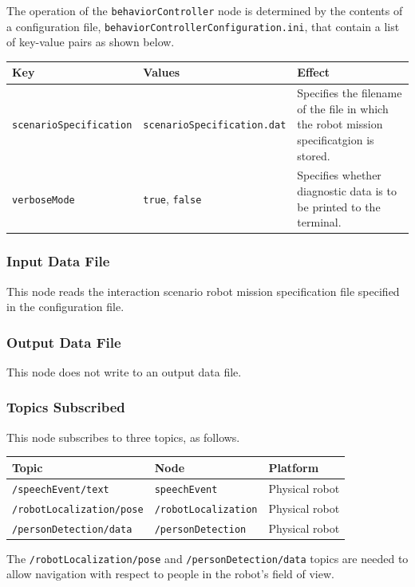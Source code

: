 \documentclass{CSSRforAfrica}
\begin{document}
The operation of the {\small \verb+behaviorController+} node is determined by the contents of a configuration file,  {\small \verb+behaviorControllerConfiguration.ini+},  that  contain a list of key-value pairs as shown below.  
 
\begin{center}
\begin{tabularx}{\linewidth}{| l | l | X|}
\hline 
{\small Key }                               & {\small Values }                                                 &  {\small Effect}       \\
\hline
{\footnotesize \verb+scenarioSpecification+}  & {\footnotesize \verb+scenarioSpecification.dat+}     & {\small Specifies the filename of the file in which the robot mission specificatgion is stored.} \\
\hline
{\footnotesize \verb+verboseMode+}  & {\footnotesize \verb+true+, \verb+false+}     & {\small Specifies whether diagnostic data is to be printed to the terminal.} \\
\hline
\end{tabularx}
\end{center}

\subsubsection*{Input Data File}
This node reads the interaction scenario robot mission specification file specified in the configuration file.


\subsubsection*{Output Data File}
This node does not write to an output data file.


\subsubsection*{Topics Subscribed}
This node  subscribes to three topics, as follows. 

\begin{center}
\begin{tabularx}{\linewidth}{| l | l | X|}
\hline 
{\small Topic }                               & {\small Node }                            &  {\small Platform}       \\
\hline
{\footnotesize \verb+/speechEvent/text+ }  & {\footnotesize \verb+speechEvent+}    & {\small Physical robot  } \\ 
\hline
{\footnotesize \verb+/robotLocalization/pose+ }  & {\footnotesize \verb+/robotLocalization+}    & {\small Physical robot  } \\ 
\hline
{\footnotesize \verb+/personDetection/data+ }  & {\footnotesize \verb+/personDetection+}    & {\small Physical robot  } \\ 
\hline
\end{tabularx}
\end{center}
The {\small \verb+/robotLocalization/pose+}  and {\small \verb+/personDetection/data+} topics are needed to allow navigation with respect to people in the robot's field of view.
\end{document}
